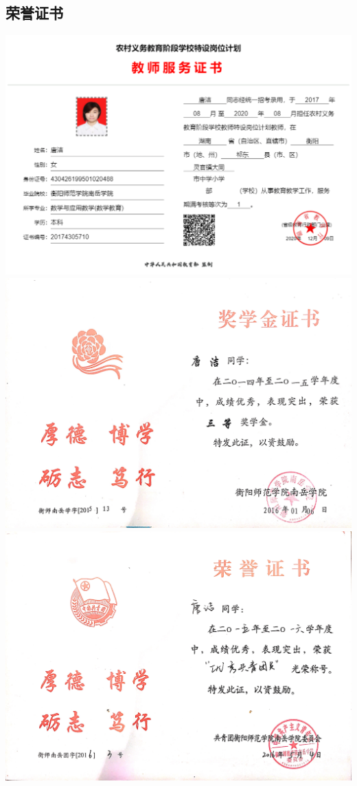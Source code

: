 \documentclass[UFT8]{ctexart}%
\begin{document}
\subsection{荣誉证书}
\begin{center}
 \includegraphics[scale=0.2]{figs/特岗服务证书.JPG }
 \includegraphics[scale=0.1]{figs/20160106.JPG }
 \includegraphics[scale=0.1]{figs/20160504.JPG }

\end{center}
\end{document}
